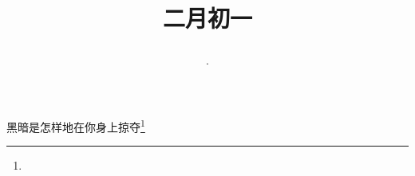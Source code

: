 \title{\date[d=10,m=3,y=2024][year:cn-y,年,month:cn,day:cn,日,·,weekday]·二月初一 }
黑暗是怎样地在你身上掠夺\footnote{ }

